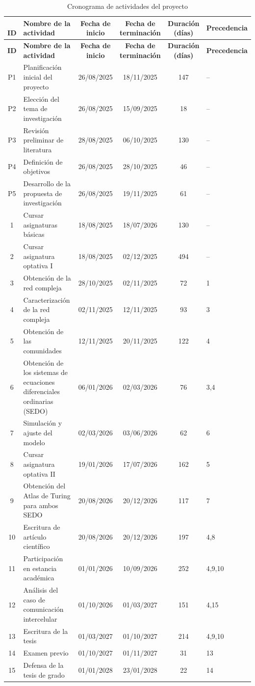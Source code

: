 \documentclass[12pt,spanish]{report}
\begin{document}
	\begin{longtable}{c p{6cm} c c c p{3cm}}
		\caption{Cronograma de actividades del proyecto}\\\
		\toprule
		\textbf{ID} & \textbf{Nombre de la actividad} & \textbf{Fecha de inicio} & \textbf{Fecha de terminación} & \textbf{Duración (días)} & \textbf{Precedencia} \\
		\midrule
		\endfirsthead
		
		\toprule
		\textbf{ID} & \textbf{Nombre de la actividad} & \textbf{Fecha de inicio} & \textbf{Fecha de terminación} & \textbf{Duración (días)} & \textbf{Precedencia} \\
		\midrule
		\endhead
		P1 & Planificación inicial del proyecto & 26/08/2025 & 18/11/2025 & 147 & -- \\
		P2 & Elección del tema de investigación & 26/08/2025 & 15/09/2025 & 18 & -- \\
		P3 & Revisión preliminar de literatura & 28/08/2025 & 06/10/2025 & 130 & -- \\
		P4 & Definición de objetivos & 26/08/2025 & 28/10/2025 & 46 & -- \\
		P5 & Desarrollo de la propuesta de investigación & 26/08/2025 & 19/11/2025 & 61 & -- \\
		\midrule
		1 & Cursar asignaturas básicas & 18/08/2025 & 18/07/2026 & 130 & -- \\
		2 & Cursar asignatura optativa I & 18/08/2025 & 02/12/2025 & 494 & -- \\
		3 & Obtención de la red compleja & 28/10/2025 & 02/11/2025 & 72 & 1 \\
		4 & Caracterización de la red compleja & 02/11/2025 & 12/11/2025 & 93 & 3 \\
		5 & Obtención de las comunidades & 12/11/2025 & 20/11/2025 & 122 & 4 \\
		6 & Obtención de los sistemas de ecuaciones diferenciales ordinarias (SEDO) & 06/01/2026 & 02/03/2026 & 76 & 3,4 \\
		7 & Simulación y ajuste del modelo & 02/03/2026 & 03/06/2026 & 62 & 6 \\
		8 & Cursar asignatura optativa II & 19/01/2026 & 17/07/2026 & 162 & 5 \\
		9 & Obtención del Atlas de Turing para ambos SEDO & 20/08/2026 & 20/12/2026 & 117 & 7 \\
		10 & Escritura de artículo científico & 20/08/2026 & 20/12/2026 & 197 & 4,8 \\
		11 & Participación en estancia académica & 01/01/2026 & 10/09/2026 & 252 & 4,9,10 \\
		12 & Análisis del caso de comunicación intercelular & 01/10/2026 & 01/03/2027 & 151 & 4,15 \\
		13 & Escritura de la tesis & 01/03/2027 & 01/10/2027 & 214 & 4,9,10 \\
		14 & Examen previo & 01/10/2027 & 01/11/2027 & 31 & 13 \\
		15 & Defensa de la tesis de grado & 01/01/2028 & 23/01/2028 & 22 & 14 \\
		\bottomrule
	\end{longtable}
	
\end{document}
